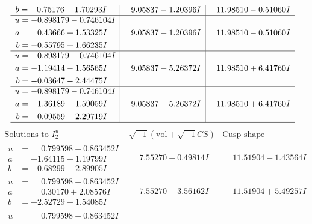 \documentclass[1p]{elsarticle_modified}
\theoremstyle{definition}
\newcommand{\I}{\sqrt{-1}}
\begin{document}
$$\begin{array}{c|c|c}
\begin{aligned}
b &= \phantom{-}0.75176 - 1.70293 I\end{aligned}
 & \phantom{-}9.05837 - 1.20396 I & \phantom{-}11.98510 - 0.51060 I \\ \hline\begin{aligned}
u &= -0.898179 - 0.746104 I \\
a &= \phantom{-}0.43666 + 1.53325 I \\
b &= -0.55795 + 1.66235 I\end{aligned}
 & \phantom{-}9.05837 - 1.20396 I & \phantom{-}11.98510 - 0.51060 I \\ \hline\begin{aligned}
u &= -0.898179 - 0.746104 I \\
a &= -1.19414 - 1.56565 I \\
b &= -0.03647 - 2.44475 I\end{aligned}
 & \phantom{-}9.05837 - 5.26372 I & \phantom{-}11.98510 + 6.41760 I \\ \hline\begin{aligned}
u &= -0.898179 - 0.746104 I \\
a &= \phantom{-}1.36189 + 1.59059 I \\
b &= -0.09559 + 2.29719 I\end{aligned}
 & \phantom{-}9.05837 - 5.26372 I & \phantom{-}11.98510 + 6.41760 I\\
 \hline 
 \end{array}$$\newpage$$\begin{array}{c|c|c}  
\text{Solutions to }I^u_{2}& \I (\text{vol} + \sqrt{-1}CS) & \text{Cusp shape}\\
 \hline 
\begin{aligned}
u &= \phantom{-}0.799598 + 0.863452 I \\
a &= -1.64115 - 1.19799 I \\
b &= -0.68299 - 2.89905 I\end{aligned}
 & \phantom{-}7.55270 + 0.49814 I & \phantom{-}11.51904 - 1.43564 I \\ \hline\begin{aligned}
u &= \phantom{-}0.799598 + 0.863452 I \\
a &= \phantom{-}0.30170 + 2.08576 I \\
b &= -2.52729 + 1.54085 I\end{aligned}
 & \phantom{-}7.55270 - 3.56162 I & \phantom{-}11.51904 + 5.49257 I \\ \hline\begin{aligned}
u &= \phantom{-}0.799598 + 0.863452 I \\

\end{aligned}
\end{array}$$
\end{document}
